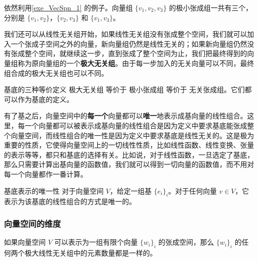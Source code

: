 \begin{example}{}
依然利用\autoref{exe_VecSpn_1} 的例子。向量组 $\{v_1, v_2, v_3\}$ 的极小张成组一共有三个，分别是 $\{v_1, v_2\}$，$\{v_2, v_3\}$ 和 $\{v_1, v_3\}$。
\end{example}

我们还可以从线性无关组开始，如果线性无关组没有张成整个空间，我们就可以加入一个张成子空间之外的向量，新向量组仍然是线性无关的；如果新向量组仍然没有张成整个空间，就继续这一步，直到张成了整个空间为止，我们把最终得到的向量组称为原向量组的一个\textbf{极大无关组}。由于每一步加入的无关向量可以不同，最终组合成的极大无关组也可以不同。

\begin{theorem}{基底的三种等价定义}
极大无关组 等价于 极小张成组 等价于 无关张成组。它们都可以作为基底的定义。
\end{theorem}


有了基之后，向量空间中的\textbf{每一个}向量都可以\textbf{唯一}地表示成基向量的线性组合。这里，每一个向量都可以被表示成基向量的线性组合是因为定义中要求基底能张成整个向量空间，而线性组合的唯一性是因为定义中要求基底是线性无关的。这是极为重要的性质，它使得向量空间上的一切线性性质，比如线性函数、线性变换、张量的表示等等，都只和基底的选择有关。比如说，对于线性函数，一旦选定了基底，那么只需要计算出基向量的函数值，我们就可以得到一切向量的函数值，而不用对每一个向量都作一番计算。

\begin{theorem}{基底表示的唯一性}\label{the_VecSpn_1}
对于向量空间 $V$，给定一组基 $\{e_i\}_i$。对于任何向量 $v\in V$，它表示为该基底的线性组合的方式是唯一的。
\end{theorem}




\subsubsection{向量空间的维度}
% 


\begin{theorem}{}\label{the_VecSpn_2}
如果向量空间 $V$ 可以表示为一组有限个向量 $\{w_i\}_i$ 的张成空间，那么 $\{w_i\}_i$ 的任何两个极大线性无关组中的元素数量都是一样的。
\end{theorem}

